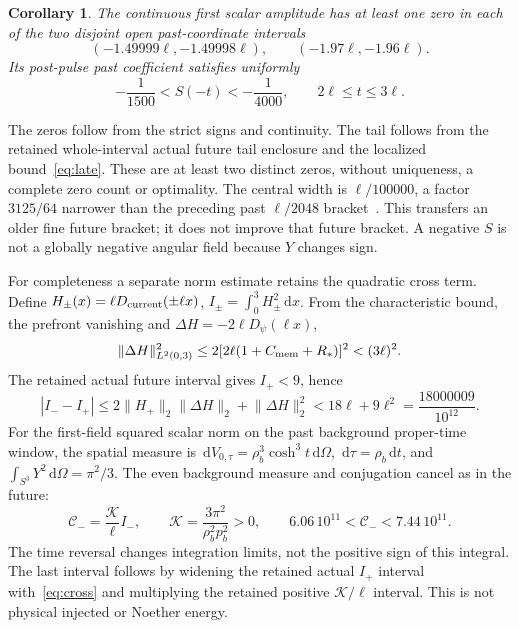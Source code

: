 \documentclass[11pt]{article}
\newtheorem{corollary}[theorem]{Corollary}
\newcommand{\dd}{\,\mathrm d}
\newcommand{\norm}[1]{\lVert#1\rVert}
\begin{document}
\begin{corollary}
The continuous first scalar amplitude has at least one zero in each of the
two disjoint open past-coordinate intervals
\begin{equation}
 (-1.49999\ell,-1.49998\ell),\qquad
 (-1.97\ell,-1.96\ell).
 \label{eq:zeros}
\end{equation}
Its post-pulse past coefficient satisfies uniformly
\begin{equation}
 -\frac1{1500}<S(-t)<-\frac1{4000},\qquad 2\ell\le t\le3\ell.
 \label{eq:tail}
\end{equation}
\end{corollary}
The zeros follow from the strict signs and continuity. The tail follows
from the retained whole-interval actual future tail enclosure and the
localized bound~\eqref{eq:late}. These are at least two distinct zeros,
without uniqueness, a complete zero count or optimality. The central width
is $\ell/100000$, a factor $3125/64$ narrower than the preceding past
$\ell/2048$ bracket~\cite{pastfuture}. This transfers an older fine future
bracket; it does not improve that future bracket. A negative $S$ is not a
globally negative angular field because $Y$ changes sign.

For completeness a separate norm estimate retains the quadratic cross term.
Define $H_\pm(x)=\ell D_{\rm current}(\pm\ell x)$,
$I_\pm=\int_0^3H_\pm^2\dd x$. From the characteristic bound, the prefront
vanishing and $\Delta H=-2\ell D_\psi(\ell x)$,
\[
 \norm{\Delta H}_{L^2(0,3)}^2
 \le 2[2\ell(1+C_{\rm mem}+R_*)]^2<(3\ell)^2.
\]
The retained actual future interval gives $I_+<9$, hence
\begin{equation}
 |I_--I_+|
 \le2\norm{H_+}_2\norm{\Delta H}_2+\norm{\Delta H}_2^2
 <18\ell+9\ell^2=\frac{18000009}{10^{12}}.
 \label{eq:cross}
\end{equation}
For the first-field squared scalar norm on the past background proper-time
window, the spatial measure is
$\dd V_{0,\tau}=\rho_b^3\cosh^3t\dd\Omega$, $\dd\tau=\rho_b\dd t$,
and $\int_{S^3}Y^2\dd\Omega=\pi^2/3$. The even background measure and
conjugation cancel as in the future:
\begin{equation}
 \mathcal C_-=\frac{\mathcal K}{\ell}I_-,\qquad
 \mathcal K=\frac{3\pi^2}{\rho_b^2p_b^2}>0,\qquad
 6.06\,10^{11}<\mathcal C_-<7.44\,10^{11}.
 \label{eq:C}
\end{equation}
The time reversal changes integration limits, not the positive sign of this
integral. The last interval follows by widening the retained actual $I_+$
interval with~\eqref{eq:cross} and multiplying the retained positive
$\mathcal K/\ell$ interval. This is not physical injected or Noether energy.
\end{document}

